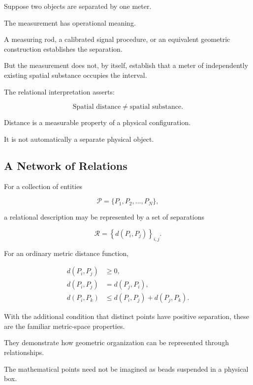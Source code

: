 \documentclass[12pt,onecolumn]{article}
\begin{document}
Suppose two objects are separated by one meter.

The measurement has operational meaning.

A measuring rod, a calibrated signal procedure,
or an equivalent geometric construction
establishes the separation.

But the measurement does not, by itself,
establish that a meter of independently
existing spatial substance occupies the
interval.

The relational interpretation asserts:

\begin{equation}
\boxed{
\text{Spatial distance}
\neq
\text{spatial substance}.
}
\end{equation}

Distance is a measurable property of a
physical configuration.

It is not automatically a separate physical
object.

\subsection{A Network of Relations}

For a collection of entities

\begin{equation}
\mathcal{P}=\{P_1,P_2,\ldots,P_N\},
\end{equation}

a relational description may be represented
by a set of separations

\begin{equation}
\mathcal{R}
=
\left\{
d(P_i,P_j)
\right\}_{i,j}.
\end{equation}

For an ordinary metric distance function,

\begin{align}
d(P_i,P_j)&\geq 0,\\
d(P_i,P_j)&=d(P_j,P_i),\\
d(P_i,P_k)&\leq
d(P_i,P_j)+d(P_j,P_k).
\end{align}

With the additional condition that distinct
points have positive separation, these are
the familiar metric-space properties.

They demonstrate how geometric organization
can be represented through relationships.

The mathematical points need not be imagined
as beads suspended in a physical box.
\end{document}
